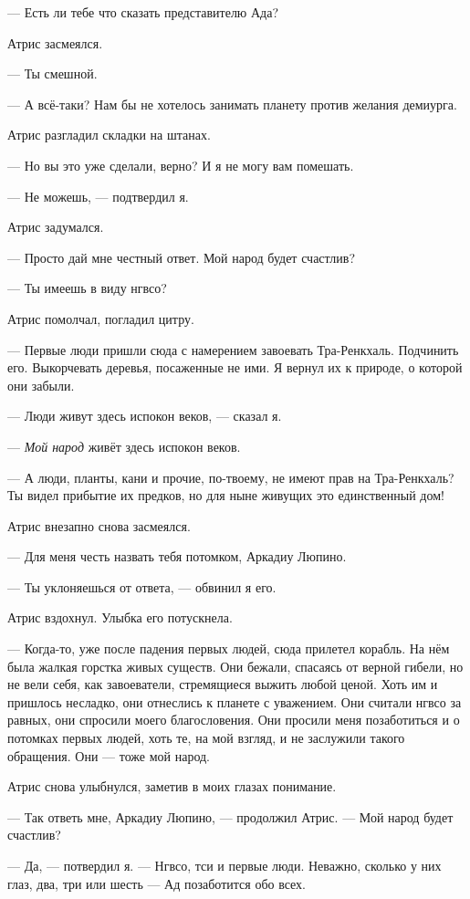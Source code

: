 --- Есть ли тебе что сказать представителю Ада?

Атрис засмеялся.

--- Ты смешной.

--- А всё-таки?
Нам бы не хотелось занимать планету против желания демиурга.

Атрис разгладил складки на штанах.

--- Но вы это уже сделали, верно?
И я не могу вам помешать.

--- Не можешь, --- подтвердил я.

Атрис задумался.

--- Просто дай мне честный ответ.
Мой народ будет счастлив?

--- Ты имеешь в виду нгвсо?

Атрис помолчал, погладил цитру.

--- Первые люди пришли сюда с намерением завоевать Тра-Ренкхаль.
Подчинить его.
Выкорчевать деревья, посаженные не ими.
Я вернул их к природе, о которой они забыли.

--- Люди живут здесь испокон веков, --- сказал я.

--- \emph{Мой народ} живёт здесь испокон веков.

--- А люди, планты, кани и прочие, по-твоему, не имеют прав на Тра-Ренкхаль?
Ты видел прибытие их предков, но для ныне живущих это единственный дом!

Атрис внезапно снова засмеялся.

--- Для меня честь назвать тебя потомком, Аркадиу Люпино.

--- Ты уклоняешься от ответа, --- обвинил я его.

Атрис вздохнул.
Улыбка его потускнела.

--- Когда-то, уже после падения первых людей, сюда прилетел корабль.
На нём была жалкая горстка живых существ.
Они бежали, спасаясь от верной гибели, но не вели себя, как завоеватели, стремящиеся выжить любой ценой.
Хоть им и пришлось несладко, они отнеслись к планете с уважением.
Они считали нгвсо за равных, они спросили моего благословения.
Они просили меня позаботиться и о потомках первых людей, хоть те, на мой взгляд, и не заслужили такого обращения.
Они --- тоже мой народ.

Атрис снова улыбнулся, заметив в моих глазах понимание.

--- Так ответь мне, Аркадиу Люпино, --- продолжил Атрис.
--- Мой народ будет счастлив?

--- Да, --- потвердил я.
--- Нгвсо, тси и первые люди.
Неважно, сколько у них глаз, два, три или шесть --- Ад позаботится обо всех.

